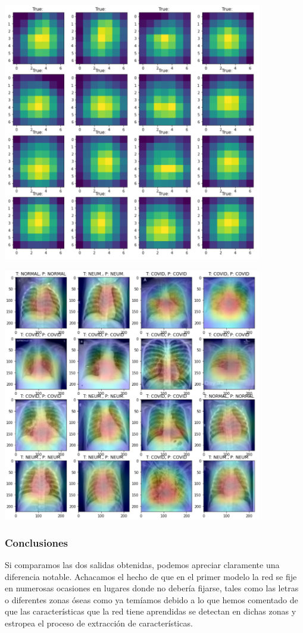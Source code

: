 \documentclass[11pt,a4paper]{article}
\theoremstyle{definition}
\begin{document}
\includegraphics[width=0.85\textwidth]{./images/xceptionfilters}

\includegraphics[width=0.85\textwidth]{./images/heatmapxception}



\subsubsection{Conclusiones}

Si comparamos las dos salidas obtenidas, podemos apreciar claramente una diferencia notable.  Achacamos el hecho de que en el primer modelo la red se fije en numerosas ocasiones en lugares donde no debería fijarse, tales como las letras o diferentes zonas óseas como ya temíamos debido a lo que hemos comentado de que las características que la red tiene aprendidas se detectan en dichas zonas y estropea el proceso de extracción de características.\\
\end{document}
